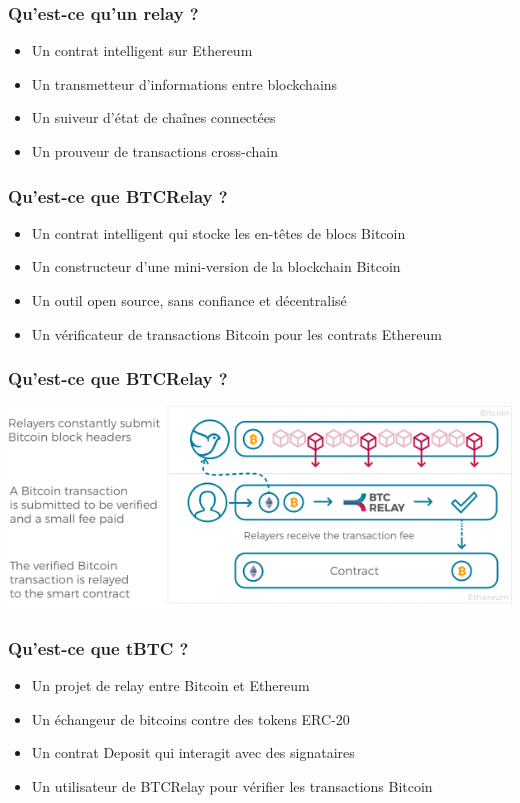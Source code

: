 \begin{frame} 
  \frametitle{Qu’est-ce qu’un relay ?} 
  \begin{itemize} 
    \item Un contrat intelligent sur Ethereum 
    \item Un transmetteur d’informations entre blockchains 
    \item Un suiveur d’état de chaînes connectées 
    \item Un prouveur de transactions cross-chain 
  \end{itemize} 
\end{frame}

\begin{frame} 
  \frametitle{Qu’est-ce que BTCRelay ?} 
  \begin{itemize} 
    \item Un contrat intelligent qui stocke les en-têtes de blocs Bitcoin 
    \item Un constructeur d’une mini-version de la blockchain Bitcoin 
    \item Un outil open source, sans confiance et décentralisé 
    \item Un vérificateur de transactions Bitcoin pour les contrats Ethereum 
  \end{itemize} 
\end{frame}

\begin{frame}
  \frametitle{Qu’est-ce que BTCRelay ?}
  \centering
  \includegraphics[scale = 0.5]{decentralisation/btcRelay.png}
\end{frame}

\begin{frame} 
  \frametitle{Qu’est-ce que tBTC ?} 
  \begin{itemize} 
    \item Un projet de relay entre Bitcoin et Ethereum 
    \item Un échangeur de bitcoins contre des tokens ERC-20 
    \item Un contrat Deposit qui interagit avec des signataires 
    \item Un utilisateur de BTCRelay pour vérifier les transactions Bitcoin 
  \end{itemize}
\end{frame}
